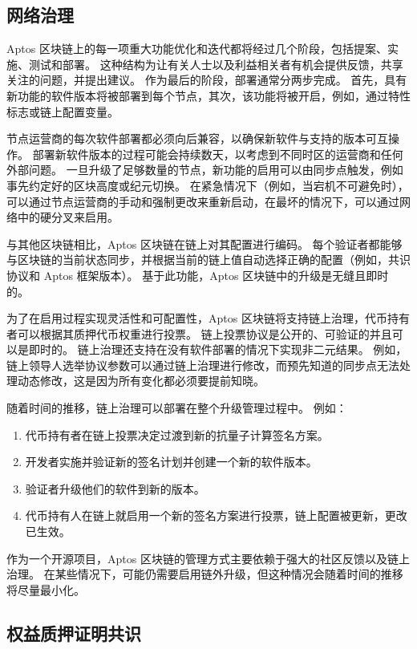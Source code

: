 \documentclass{article}
\begin{document}
\subsection{网络治理}
\label{subsec:network_governance}

Aptos 区块链上的每一项重大功能优化和迭代都将经过几个阶段，包括提案、实施、测试和部署。 这种结构为让有关人士以及利益相关者有机会提供反馈，共享关注的问题，并提出建议。 作为最后的阶段，部署通常分两步完成。 首先，具有新功能的软件版本将被部署到每个节点，其次，该功能将被开启，例如，通过特性标志或链上配置变量。

节点运营商的每次软件部署都必须向后兼容，以确保新软件与支持的版本可互操作。 部署新软件版本的过程可能会持续数天，以考虑到不同时区的运营商和任何外部问题。 一旦升级了足够数量的节点，新功能的启用可以由同步点触发，例如事先约定好的区块高度或纪元切换。 在紧急情况下（例如，当宕机不可避免时），可以通过节点运营商的手动和强制更改来重新启动，在最坏的情况下，可以通过网络中的硬分叉来启用。

与其他区块链相比，Aptos 区块链在链上对其配置进行编码。 每个验证者都能够与区块链的当前状态同步，并根据当前的链上值自动选择正确的配置（例如，共识协议和 Aptos 框架版本）。 基于此功能，Aptos 区块链中的升级是无缝且即时的。

为了在启用过程实现灵活性和可配置性，Aptos 区块链将支持链上治理，代币持有者可以根据其质押代币权重进行投票。 链上投票协议是公开的、可验证的并且可以是即时的。 链上治理还支持在没有软件部署的情况下实现非二元结果。 例如，链上领导人选举协议参数可以通过链上治理进行修改，而预先知道的同步点无法处理动态修改，这是因为所有变化都必须要提前知晓。

随着时间的推移，链上治理可以部署在整个升级管理过程中。 例如：

\begin{enumerate}
\item 代币持有者在链上投票决定过渡到新的抗量子计算签名方案。
\item 开发者实施并验证新的签名计划并创建一个新的软件版本。
\item 验证者升级他们的软件到新的版本。
\item 代币持有人在链上就启用一个新的签名方案进行投票，链上配置被更新，更改已生效。
\end{enumerate}

作为一个开源项目，Aptos 区块链的管理方式主要依赖于强大的社区反馈以及链上治理。 在某些情况下，可能仍需要启用链外升级，但这种情况会随着时间的推移将尽量最小化。

\subsection{权益质押证明共识}
\end{document}
